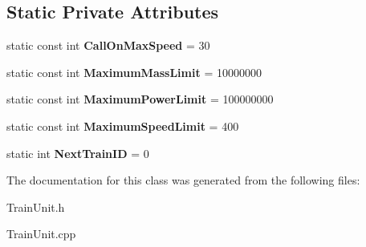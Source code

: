 \subsection*{Static Private Attributes}
\begin{DoxyCompactItemize}
\item 
\mbox{\label{class_t_train_a70e34e0666fd1c04b6c9866bfe45290f}} 
static const int {\bfseries Call\+On\+Max\+Speed} = 30
\item 
\mbox{\label{class_t_train_a1ab673136ad153947d373b5fd48a50e9}} 
static const int {\bfseries Maximum\+Mass\+Limit} = 10000000
\item 
\mbox{\label{class_t_train_a06452bf9f2c18e9d83d4b33cc24ada42}} 
static const int {\bfseries Maximum\+Power\+Limit} = 100000000
\item 
\mbox{\label{class_t_train_afac2548a159e8c341c008810d15e2a88}} 
static const int {\bfseries Maximum\+Speed\+Limit} = 400
\item 
\mbox{\label{class_t_train_a59a6ad055b319a73e954e9bef5f7593c}} 
static int {\bfseries Next\+Train\+ID} = 0
\end{DoxyCompactItemize}


The documentation for this class was generated from the following files\+:\begin{DoxyCompactItemize}
\item 
Train\+Unit.\+h\item 
Train\+Unit.\+cpp\end{DoxyCompactItemize}
